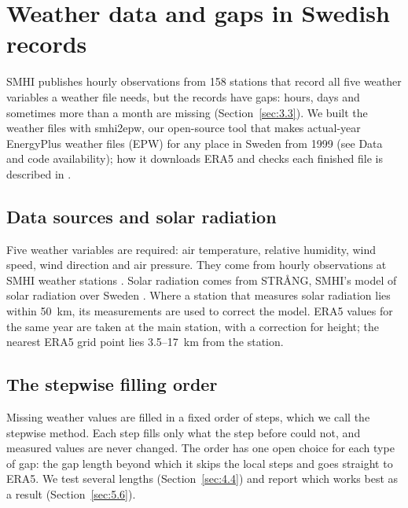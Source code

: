 \section{Weather data and gaps in Swedish records}\label{sec:3}

SMHI publishes hourly observations from 158 stations that record all five weather variables a weather file needs, but the records have gaps: hours, days and sometimes more than a month are missing (Section~\ref{sec:3.3}). We built the weather files with smhi2epw, our open-source tool that makes actual-year EnergyPlus weather files (EPW) for any place in Sweden from 1999 (see Data and code availability); how it downloads ERA5 and checks each finished file is described in .

\subsection{Data sources and solar radiation}\label{sec:3.1}

Five weather variables are required: air temperature, relative humidity, wind speed, wind direction and air pressure. They come from hourly observations at SMHI weather stations \citep{smhi2026a}. Solar radiation comes from STRÅNG, SMHI's model of solar radiation over Sweden \citep{landelius2001}. Where a station that measures solar radiation lies within 50~km, its measurements are used to correct the model. ERA5 values for the same year are taken at the main station, with a correction for height; the nearest ERA5 grid point lies 3.5--17~km from the station.

\subsection{The stepwise filling order}\label{sec:3.2}

Missing weather values are filled in a fixed order of steps, which we call the stepwise method. Each step fills only what the step before could not, and measured values are never changed. The order has one open choice for each type of gap: the gap length beyond which it skips the local steps and goes straight to ERA5. We test several lengths (Section~\ref{sec:4.4}) and report which works best as a result (Section~\ref{sec:5.6}).

